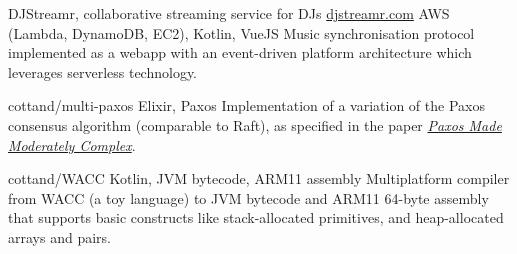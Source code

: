 \begin{entrylist}
    \projEntry
    {DJStreamr, collaborative streaming service for DJs}
    {\href{https://djstreamr.com}{djstreamr.com}}
    {AWS (Lambda, DynamoDB, EC2), Kotlin, VueJS}
    {
        Music synchronisation protocol implemented as a webapp with an event-driven platform
        architecture which leverages serverless technology.
    }

    {cottand/multi-paxos}
    {Elixir, Paxos}
    {
        Implementation of a variation of the Paxos consensus algorithm (comparable to Raft), as specified in the paper
    \href{https://dl.acm.org/citation.cfm?id=2673577}{\textit{Paxos Made Moderately Complex}}.
    }

    {cottand/WACC}
    {Kotlin, JVM bytecode, ARM11 assembly}
    {
        Multiplatform compiler from WACC (a toy language) to JVM bytecode and ARM11 64-byte assembly
    that supports basic constructs like stack-allocated primitives, and heap-allocated arrays
    and pairs.
    }





\end{entrylist}

